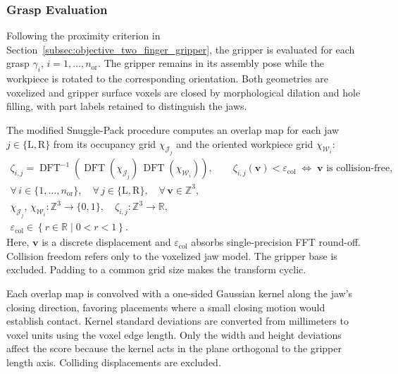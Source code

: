 \subsubsection{Grasp Evaluation}
\label{sec:grasp_eval}

Following the proximity criterion in
Section~\ref{subsec:objective_two_finger_gripper}, the gripper is evaluated
for each grasp $\gamma_i$, $i=1,\ldots,n_{\mathrm{or}}$.
The gripper remains in its assembly pose while the workpiece is rotated
to the corresponding orientation. Both geometries are voxelized and
gripper surface voxels are closed by morphological dilation and hole
filling, with part labels retained to distinguish the jaws.

The modified Snuggle-Pack procedure computes an overlap map for each
jaw $j\in\{\mathrm{L},\mathrm{R}\}$ from its occupancy grid
$\chi_{\mathcal{J}_j}$ and the oriented workpiece grid
$\chi_{\mathcal{W}_i}$:
\begin{equation}
    \label{eq:snuggle_overlap}
    \begin{gathered}
        \zeta_{i,j}
        =
        \operatorname{DFT}^{-1}\!\left(
            \operatorname{DFT}(\chi_{\mathcal{J}_j})\,
            \operatorname{DFT}(\chi_{\mathcal{W}_i})
        \right),
        \qquad
        \zeta_{i,j}(\mathbf{v}) < \varepsilon_{\mathrm{col}}
        \;\Longleftrightarrow\;
        \mathbf{v} \text{ is collision-free},
        \\[4pt]
        \forall\, i \in \{1,\ldots,n_{\mathrm{or}}\},
        \quad
        \forall\, j \in \{\mathrm{L},\mathrm{R}\},
        \quad
        \forall\, \mathbf{v} \in \mathbb{Z}^{3},
        \\[2pt]
        \chi_{\mathcal{J}_j},\, \chi_{\mathcal{W}_i} : \mathbb{Z}^{3} \rightarrow \{0,1\},
        \quad
        \zeta_{i,j} : \mathbb{Z}^{3} \rightarrow \mathbb{R},
        \\[2pt]
        \varepsilon_{\mathrm{col}} \in \left\{ r \in \mathbb{R} \mid 0 < r < 1 \right\}.
    \end{gathered}
\end{equation}
Here, $\mathbf{v}$ is a discrete displacement and
$\varepsilon_{\mathrm{col}}$ absorbs single-precision FFT round-off.
Collision freedom refers only to the voxelized jaw model. The gripper
base is excluded. Padding to a common grid size makes the transform cyclic.

Each overlap map is convolved with a one-sided Gaussian kernel along
the jaw's closing direction, favoring placements where a small closing
motion would establish contact. Kernel standard deviations are converted
from millimeters to voxel units using the voxel edge length. Only the
width and height deviations affect the score because the kernel acts
in the plane orthogonal to the gripper length axis. Colliding
displacements are excluded.

